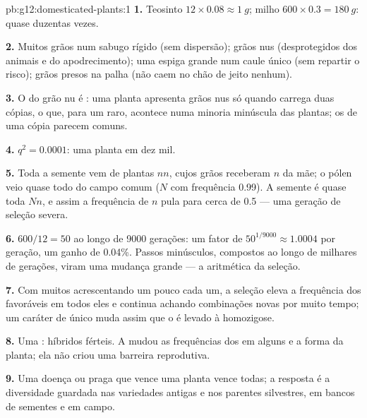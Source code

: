 \begin{solution}{pb:g12:domesticated-plants:1}
\textbf{1.} Teosinto $12 \times 0.08 \approx \qty{1}{g}$; milho $600
\times 0.3 = \qty{180}{g}$: quase duzentas vezes.

\textbf{2.} Muitos grãos num sabugo rígido (sem dispersão); grãos nus
(desprotegidos dos animais e do apodrecimento); uma espiga grande num
caule único (sem repartir o risco); grãos presos na palha (não caem no
chão de jeito nenhum).

\textbf{3.} O  do grão nu é : uma planta apresenta grãos
nus só quando carrega duas cópias, o que, para um  raro, acontece
numa minoria minúscula das plantas; os  de uma cópia parecem comuns.

\textbf{4.} $q^2 = 0.0001$: uma planta em dez mil.

\textbf{5.} Toda a semente vem de plantas $nn$, cujos grãos receberam
$n$ da mãe; o pólen veio quase todo do campo comum ($N$ com frequência
0.99). A semente é quase toda $Nn$, e assim a frequência de $n$ pula
para cerca de 0.5 --- uma geração de seleção severa.

\textbf{6.} $600/12 = 50$ ao longo de 9000 gerações: um fator de $50^{1/9000}
\approx 1.0004$ por geração, um ganho de 0.04\%. Passos minúsculos,
compostos ao longo de milhares de gerações, viram uma mudança grande
--- a aritmética da seleção.

\textbf{7.} Com muitos  acrescentando um pouco cada um, a seleção
eleva a frequência dos  favoráveis em todos eles e continua
achando combinações novas por muito tempo; um caráter de  único
muda assim que o   é levado à homozigose.

\textbf{8.} Uma : híbridos férteis. A  mudou as
frequências dos  em alguns  e a forma da planta; ela não
criou uma barreira reprodutiva.

\textbf{9.} Uma doença ou praga que vence uma planta vence todas; a
resposta é a diversidade guardada nas variedades antigas e nos parentes
silvestres, em bancos de sementes e em campo.


\end{solution}
